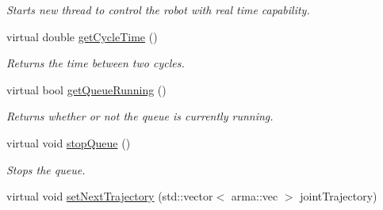\begin{DoxyCompactItemize}
\begin{DoxyCompactList}\small\item\em Starts new thread to control the robot with real time capability. \end{DoxyCompactList}\item 
virtual double \hyperlink{classkukadu_1_1ControlQueue_a82349f67c4ea6f2dc2689e765717d8e2}{get\+Cycle\+Time} ()
\begin{DoxyCompactList}\small\item\em Returns the time between two cycles. \end{DoxyCompactList}\item 
virtual bool \hyperlink{classkukadu_1_1ControlQueue_aa02fcb2c8cd2c1c8ca553ae636000beb}{get\+Queue\+Running} ()
\begin{DoxyCompactList}\small\item\em Returns whether or not the queue is currently running. \end{DoxyCompactList}\item 
virtual void \hyperlink{classkukadu_1_1ControlQueue_a8d413404960c7597032876396777e38f}{stop\+Queue} ()\hypertarget{classkukadu_1_1ControlQueue_a8d413404960c7597032876396777e38f}{}\label{classkukadu_1_1ControlQueue_a8d413404960c7597032876396777e38f}

\begin{DoxyCompactList}\small\item\em Stops the queue. \end{DoxyCompactList}\item 
virtual void \hyperlink{classkukadu_1_1ControlQueue_a0025c5c010a1b33d637e52fb24f767b2}{set\+Next\+Trajectory} (std\+::vector$<$ arma\+::vec $>$ joint\+Trajectory)\hypertarget{classkukadu_1_1ControlQueue_a0025c5c010a1b33d637e52fb24f767b2}{}\label{classkukadu_1_1ControlQueue_a0025c5c010a1b33d637e52fb24f767b2}


\end{DoxyCompactItemize}
